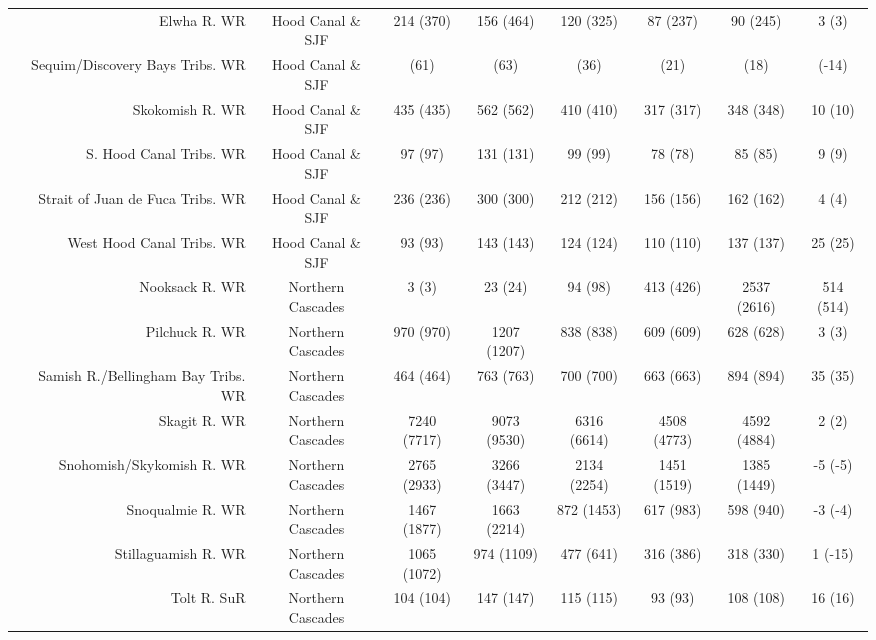 \documentclass[]{article}
\begin{document}
\begin{landscape}
\begin{table}[p]
\begin{tabular}{r|c|cccccc}
  Elwha R. WR & Hood Canal \& SJF & 214 (370) & 156 (464) & 120 (325) & 87 (237) & 90 (245) & 3 (3) \\ 
  Sequim/Discovery Bays Tribs. WR & Hood Canal \& SJF &  (61) &  (63) &  (36) &  (21) &  (18) &  (-14) \\ 
  Skokomish R. WR & Hood Canal \& SJF & 435 (435) & 562 (562) & 410 (410) & 317 (317) & 348 (348) & 10 (10) \\ 
  S. Hood Canal Tribs. WR & Hood Canal \& SJF & 97 (97) & 131 (131) & 99 (99) & 78 (78) & 85 (85) & 9 (9) \\ 
  Strait of Juan de Fuca Tribs. WR & Hood Canal \& SJF & 236 (236) & 300 (300) & 212 (212) & 156 (156) & 162 (162) & 4 (4) \\ 
  West Hood Canal Tribs. WR & Hood Canal \& SJF & 93 (93) & 143 (143) & 124 (124) & 110 (110) & 137 (137) & 25 (25) \\ 
  Nooksack R. WR & Northern Cascades & 3 (3) & 23 (24) & 94 (98) & 413 (426) & 2537 (2616) & 514 (514) \\ 
  Pilchuck R. WR & Northern Cascades & 970 (970) & 1207 (1207) & 838 (838) & 609 (609) & 628 (628) & 3 (3) \\ 
  Samish R./Bellingham Bay Tribs. WR & Northern Cascades & 464 (464) & 763 (763) & 700 (700) & 663 (663) & 894 (894) & 35 (35) \\ 
  Skagit R. WR & Northern Cascades & 7240 (7717) & 9073 (9530) & 6316 (6614) & 4508 (4773) & 4592 (4884) & 2 (2) \\ 
  Snohomish/Skykomish R. WR & Northern Cascades & 2765 (2933) & 3266 (3447) & 2134 (2254) & 1451 (1519) & 1385 (1449) & -5 (-5) \\ 
  Snoqualmie R. WR & Northern Cascades & 1467 (1877) & 1663 (2214) & 872 (1453) & 617 (983) & 598 (940) & -3 (-4) \\ 
  Stillaguamish R. WR & Northern Cascades & 1065 (1072) & 974 (1109) & 477 (641) & 316 (386) & 318 (330) & 1 (-15) \\ 
  Tolt R. SuR & Northern Cascades & 104 (104) & 147 (147) & 115 (115) & 93 (93) & 108 (108) & 16 (16) \\ 
   \hline
\end{tabular}
\end{table}
\end{landscape}
\end{document}
